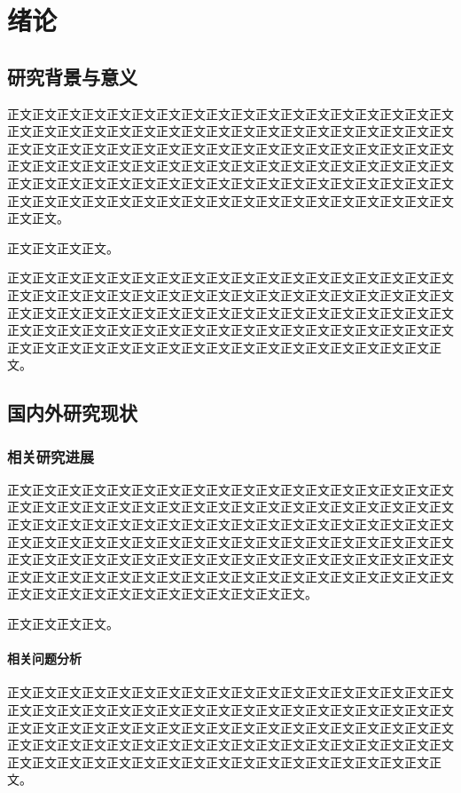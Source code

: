 \chapter{绪论}\label{chap:introduction}
\section{研究背景与意义}
正文正文正文正文正文正文正文正文正文正文正文正文正文正文正文正文正文正文正文正文正文正文正文正文正文正文正文正文正文正文正文正文正文正文正文正文正文正文正文正文正文正文正文正文正文正文正文正文正文正文正文正文正文正文正文正文正文正文正文正文正文正文正文正文正文正文正文正文正文正文正文正文正文正文正文正文正文正文正文正文正文正文正文正文正文正文正文正文正文正文正文正文正文正文正文正文正文正文正文正文正文正文正文正文正文正文正文正文正文正文。

正文正文正文正文\cite{gbt7714-2005}。

正文正文正文正文正文正文正文正文正文正文正文正文正文正文正文正文正文正文正文正文正文正文正文正文正文正文正文正文正文正文正文正文正文正文正文正文正文正文正文正文正文正文正文正文正文正文正文正文正文正文正文正文正文正文正文正文正文正文正文正文正文正文正文正文正文正文正文正文正文正文正文正文正文正文正文正文正文正文正文正文正文正文正文正文正文正文正文正文正文正文。

\section{国内外研究现状}
\subsection{相关研究进展}
正文正文正文正文正文正文正文正文正文正文正文正文正文正文正文正文正文正文正文正文正文正文正文正文正文正文正文正文正文正文正文正文正文正文正文正文正文正文正文正文正文正文正文正文正文正文正文正文正文正文正文正文正文正文正文正文正文正文正文正文正文正文正文正文正文正文正文正文正文正文正文正文正文正文正文正文正文正文正文正文正文正文正文正文正文正文正文正文正文正文正文正文正文正文正文正文正文正文正文正文正文正文正文正文正文正文正文正文正文正文正文正文正文正文正文正文正文正文正文正文。

正文正文正文正文\cite{lamport1994,knuth1984}。

\subsubsection{相关问题分析}
正文正文正文正文正文正文正文正文正文正文正文正文正文正文正文正文正文正文正文正文正文正文正文正文正文正文正文正文正文正文正文正文正文正文正文正文正文正文正文正文正文正文正文正文正文正文正文正文正文正文正文正文正文正文正文正文正文正文正文正文正文正文正文正文正文正文正文正文正文正文正文正文正文正文正文正文正文正文正文正文正文正文正文正文正文正文正文正文正文正文。

